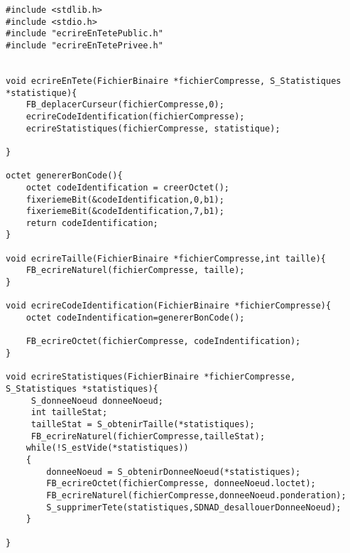 \begin{verbatim}
#include <stdlib.h>
#include <stdio.h>
#include "ecrireEnTetePublic.h"
#include "ecrireEnTetePrivee.h"


void ecrireEnTete(FichierBinaire *fichierCompresse, S_Statistiques *statistique){
	FB_deplacerCurseur(fichierCompresse,0);
	ecrireCodeIdentification(fichierCompresse);
	ecrireStatistiques(fichierCompresse, statistique);
	
}

octet genererBonCode(){
	octet codeIdentification = creerOctet();
	fixeriemeBit(&codeIdentification,0,b1);
	fixeriemeBit(&codeIdentification,7,b1);
	return codeIdentification;
}

void ecrireTaille(FichierBinaire *fichierCompresse,int taille){
	FB_ecrireNaturel(fichierCompresse, taille);
}

void ecrireCodeIdentification(FichierBinaire *fichierCompresse){
	octet codeIndentification=genererBonCode();
	
	FB_ecrireOctet(fichierCompresse, codeIndentification);
}

void ecrireStatistiques(FichierBinaire *fichierCompresse, S_Statistiques *statistiques){
	 S_donneeNoeud donneeNoeud;
	 int tailleStat;
	 tailleStat = S_obtenirTaille(*statistiques);
	 FB_ecrireNaturel(fichierCompresse,tailleStat);
	while(!S_estVide(*statistiques))
	{
		donneeNoeud = S_obtenirDonneeNoeud(*statistiques);
		FB_ecrireOctet(fichierCompresse, donneeNoeud.loctet);
		FB_ecrireNaturel(fichierCompresse,donneeNoeud.ponderation);
		S_supprimerTete(statistiques,SDNAD_desallouerDonneeNoeud);
	}
	
}

\end{verbatim}
 
